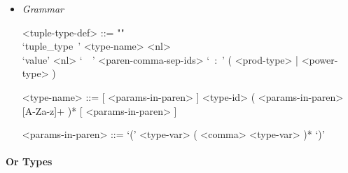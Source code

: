 \documentclass{article}
\begin{document}
\begin{itemize}
\item \textit{Grammar}

\begin{grammar}
<tuple-type-def> ::= ""\\
`tuple_type\ ' <type-name> <nl> \\
`value' <nl> `\ \ ' <paren-comma-sep-ids> `\ :\ '
( <prod-type> | <power-type> )

<type-name> ::= 
[ <params-in-paren> ] <type-id> ( <params-in-paren> [A-Za-z]+ )*
[ <params-in-paren> ]

<params-in-paren> ::= `(' <type-var> ( <comma> <type-var> )* `)'
\end{grammar}

\end{itemize}

\paragraph{Or Types}
\end{document}
